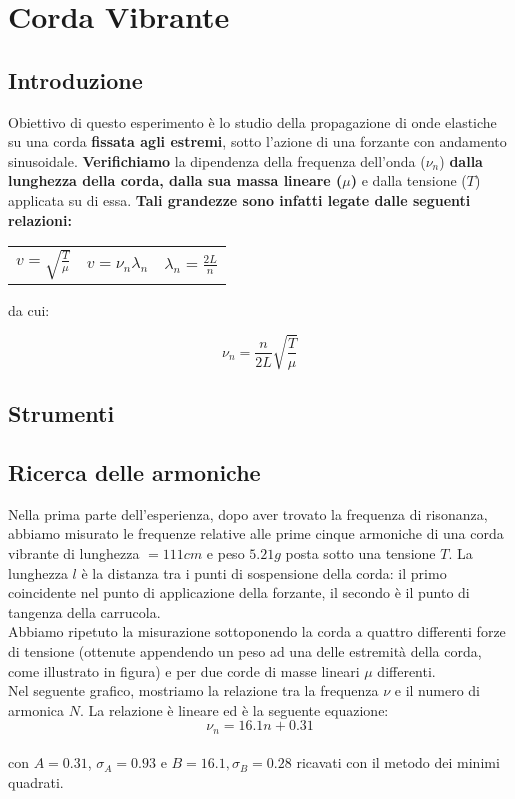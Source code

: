 

\chapter{Corda Vibrante}

\section{Introduzione}

Obiettivo di questo esperimento è lo studio della propagazione di onde elastiche su una corda \textbf{fissata agli estremi}, sotto l'azione di una forzante con andamento sinusoidale. \textbf{Verifichiamo} la dipendenza della frequenza dell'onda ($\nu_n$) \textbf{dalla lunghezza della corda, dalla sua massa lineare ($\mu$)} e dalla tensione ($T$) applicata su di essa.
\textbf{Tali grandezze sono infatti legate dalle seguenti relazioni:}
\begin{center}
\begin{tabular}{c c c}
$
v= \sqrt{\frac{T}{\mu}} 
$
&
$
v= \nu_{n} \lambda_n
$ 
&
$
\lambda_n= \frac{2L}{n} 
$
\\
\end{tabular}
\end{center}

da cui:

\begin{equation}
\nu_n=\frac{n}{2L}\sqrt{\frac{T}{\mu}}
\end{equation}


\section{Strumenti}

\section{Ricerca delle armoniche}

Nella prima parte dell'esperienza, dopo aver trovato la frequenza di risonanza, abbiamo misurato le frequenze relative alle prime cinque armoniche di una corda vibrante di lunghezza $=111 cm$ e peso $5.21 g$ posta sotto una tensione $T$. La lunghezza $l$ è la distanza tra i punti di sospensione della corda: il primo coincidente nel punto di applicazione della forzante, il secondo è il punto di tangenza della carrucola.  
\\

Abbiamo ripetuto la misurazione sottoponendo la corda a quattro differenti forze di tensione (ottenute appendendo un peso ad una delle estremità della corda, come illustrato in figura) e per due corde di masse lineari $\mu$ differenti. 
\\
Nel seguente grafico, mostriamo la relazione tra la frequenza $\nu$ e il numero di armonica $N$. La relazione è lineare ed è la seguente equazione:
$$ \nu_n = 16.1n + 0.31 $$ 
\\
con $A= 0.31$, $\sigma_A=  0.93$ e $B=16.1, \sigma_B = 0.28 $ ricavati con il metodo dei minimi quadrati. 

